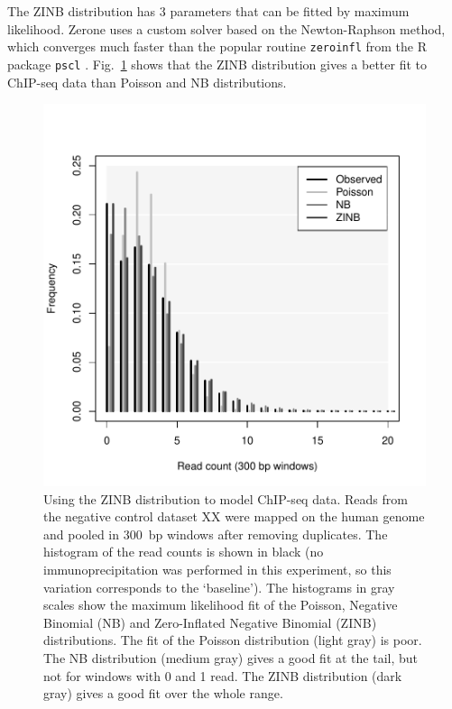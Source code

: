 \documentclass{bioinfo}
\begin{document}
\begin{methods}
The ZINB distribution has 3 parameters that can be fitted by maximum
likelihood. Zerone uses a custom solver based on the Newton-Raphson
method, which converges much faster than the popular routine
\texttt{zeroinfl} \citep{psclb} from the R \citep{R} package \texttt{pscl}
\citep{pscla}.
Fig.~\ref{fig:ZINB_fit} shows that the ZINB distribution gives a better
fit to ChIP-seq data than Poisson and NB distributions.

\begin{figure}[!tpb]
\centerline{\includegraphics[scale=0.55]{ZINB_fit.pdf}}
\caption{Using the ZINB distribution to model ChIP-seq data. Reads from
the negative control dataset XX were mapped on the human genome and pooled
in 300~bp windows after removing duplicates. The histogram of the read
counts is shown in black (no immunoprecipitation was performed in this
experiment, so this variation corresponds to the `baseline'). The
histograms in gray scales show the maximum likelihood fit of the Poisson,
Negative Binomial (NB) and Zero-Inflated Negative Binomial (ZINB)
distributions. The fit of the Poisson distribution (light gray) is poor.
The NB distribution (medium gray) gives a good fit at the tail, but not
for windows with 0 and 1 read. The ZINB distribution (dark gray) gives
a good fit over the whole range.
}\label{fig:ZINB_fit}
\end{figure}


\end{methods}
\end{document}

